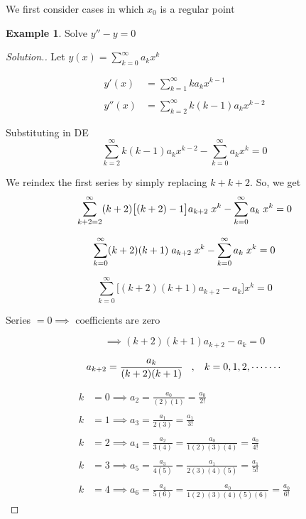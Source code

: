 \documentclass[11pt,a4paper]{article}
\theoremstyle{definition}
\newtheorem{exa}[thm]{Example}
\newenvironment{solution}
  {\renewcommand{\qedsymbol}{}\begin{proof}[\textit{Solution}.]}
  {\end{proof}}
\begin{document}
We first consider cases in which $x_0$ is a regular point


\begin{exa}


Solve $y'' - y = 0$
\end{exa}


\begin{solution}


Let $\displaystyle{y(x) = \sum^{\infty} _{k = 0} a_k x^k}$

\begin{align*}
y'(x) & = \sum^{\infty} _{k = 1}k a_k x^{k-1}\\\\
y''(x) &  = \sum^{\infty} _{k = 2}k(k-1)a_k x^{k-2}
\end{align*}

Substituting in DE
$$\sum^{\infty} _{k = 2}k(k-1)a_k x^{k-2} -\sum^{\infty} _{k = 0} a_k x^k = 0$$

We reindex the first series by simply replacing $k + k + 2$. So, we get 
$$\sum^{\infty}_{k + 2 = 2} (k + 2) \big[(k+2) -1\big] a_{k + 2} \hspace{0.1cm} x^k - \sum^{\infty}_{k = 0} a_k \hspace{0.1cm}x^k = 0$$

$$\sum^{\infty}_{k = 0} (k+ 2 ) (k + 1) \hspace{0.1cm} a_{k + 2} \hspace{0.1cm} x^k - \sum^{\infty}_{k = 0} a_k\hspace{0.1cm} x^k = 0$$

$$\sum^{\infty}_{k=0}\Big[(k+2)(k+1)a_{k+2} - a_k\Big] x^k = 0$$

Series $= 0 \implies$ coefficients are zero


$$\implies (k+2)(k+1)a_{k+2} - a_k = 0$$

$$a_{k+2} = \frac{a_k}{(k+2)(k+1)}\hspace{0.3cm},\hspace{0.3cm} k = 0,1,2,\cdot\cdots\cdots$$

\begin{align*}
k & =  0 \implies a_2 = \frac{a_0}{(2)(1)} = \frac{a_0}{2!}\\\\
k & = 1 \implies a_3 = \frac{a_1}{2(3)} = \frac{a_1}{3!}\\\\
k & = 2 \implies a_4 = \frac{a_2}{3(4)} = \frac{a_0}{1(2)(3)(4)} = \frac{a_0}{4!}\\\\
k & = 3 \implies a_5 = \frac{a_3}{4(5)} = \frac{a_1}{2(3)(4)(5)}=\frac{a_1}{5!}\\\\
k & = 4 \implies a_6 = \frac{a_4}{5(6)}= \frac{a_0}{1(2)(3)(4)(5)(6)}= \frac{a_0}{6!}
\end{align*}


\end{solution}
\end{document}
